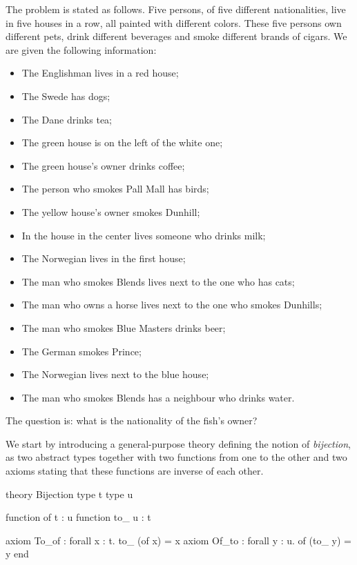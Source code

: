 The problem is stated as follows. Five persons, of five
different nationalities, live in five houses in a row, all
painted with different colors.
These five persons own different pets, drink different beverages and
smoke different brands of cigars.
We are given the following information:
\begin{itemize}
\item The Englishman lives in a red house;

\item The Swede has dogs;

\item The Dane drinks tea;

\item The green house is on the left of the white one;

\item The green house's owner drinks coffee;

\item The person who smokes Pall Mall has birds;

\item The yellow house's owner smokes Dunhill;

\item In the house in the center lives someone who drinks milk;

\item The Norwegian lives in the first house;

\item The man who smokes Blends lives next to the one who has cats;

\item The man who owns a horse lives next to the one who smokes Dunhills;

\item The man who smokes Blue Masters drinks beer;

\item The German smokes Prince;

\item The Norwegian lives next to the blue house;

\item The man who smokes Blends has a neighbour who drinks water.
\end{itemize}
The question is: what is the nationality of the fish's owner?

We start by introducing a general-purpose theory defining the notion
of \emph{bijection}, as two abstract types together with two functions from
one to the other and two axioms stating that these functions are
inverse of each other.
\begin{whycode}
theory Bijection
  type t
  type u

  function of t : u
  function to_ u : t

  axiom To_of : forall x : t. to_ (of x) = x
  axiom Of_to : forall y : u. of (to_ y) = y
end
\end{whycode}

